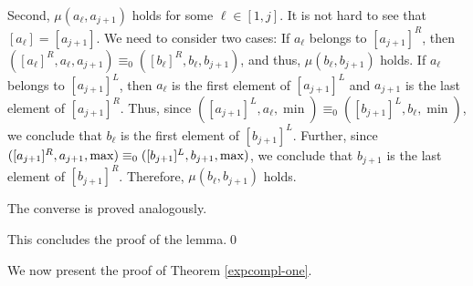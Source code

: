 \documentclass{LMCS}
\newcommand{\M}{{\mu}}
\renewcommand{\l}{\ell}
\theoremstyle{plain}
\theoremstyle{definition}
\begin{document}
\begin{enumerate}[$\bullet$]
Second, $\M(a_\l,a_{j+1})$ holds for some $\l \in [1,j]$. It is not
hard to see that $[a_\l] = [a_{j+1}]$. 
We need to consider two cases: If $a_\l$ belongs to
$[a_{j+1}]^R$, then $([a_\l]^R,a_\l,a_{j+1}) \equiv_{0}
([b_\l]^R,b_\l,b_{j+1})$, and thus, $\M(b_\l,b_{j+1})$ holds. If
$a_\l$ belongs to $[a_{j+1}]^L$, then 
$a_\l$ is the first element of $[a_{j+1}]^L$ and
$a_{j+1}$ is the last element of $[a_{j+1}]^R$. Thus, since 
$([a_{j+1}]^L,a_\l,\min) \equiv_0 ([b_{j+1}]^L,b_\l,\min)$, we conclude that $b_\l$ is
the first element of $[b_{j+1}]^L$. Further, since 
$([a_{j+1}]^R,a_{j+1},{\rm max}) \equiv_0 ([b_{j+1}]^L,b_{j+1},{\rm max})$, 
we conclude that
$b_{j+1}$ is the last element of $[b_{j+1}]^R$. Therefore,
$\M(b_\l,b_{j+1})$ holds.

The converse is proved analogously. 
\end{enumerate} 
This concludes the proof of the lemma.\qed

We now present the proof of Theorem \ref{expcompl-one}. 
\end{document}
